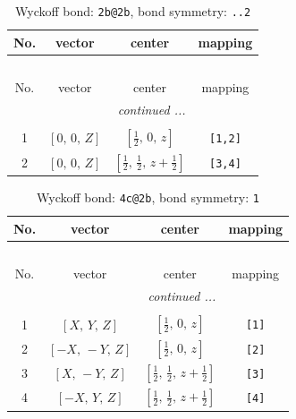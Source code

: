 \documentclass[fleqn,8pt]{jsarticle}
\begin{document}
\renewcommand{\arraystretch}{1.2}
\begin{longtable}{cccc}
\caption{Wyckoff bond: {\tt 2b@2b}, bond symmetry: {\tt ..2}}
 \\
 \hline \hline
No. & vector & center & mapping \\ \hline \endfirsthead

\multicolumn{3}{l}{\tablename\ \thetable{}} \\
 \hline \hline
No. & vector & center & mapping \\ \hline \endhead

 \hline \hline
\multicolumn{3}{r}{\footnotesize\it continued ...} \\ \endfoot

 \hline \hline
\multicolumn{3}{r}{} \\ \endlastfoot

1 & $\left[ 0,\, 0,\, Z \right]$ & $\left[ \frac{1}{2},\, 0,\, z \right]$ & {\tt [1,2]} \\ \hline
2 & $\left[ 0,\, 0,\, Z \right]$ & $\left[ \frac{1}{2},\, \frac{1}{2},\, z + \frac{1}{2} \right]$ & {\tt [3,4]} \\
\end{longtable}
\renewcommand{\arraystretch}{1.2}
\begin{longtable}{cccc}
\caption{Wyckoff bond: {\tt 4c@2b}, bond symmetry: {\tt 1}}
 \\
 \hline \hline
No. & vector & center & mapping \\ \hline \endfirsthead

\multicolumn{3}{l}{\tablename\ \thetable{}} \\
 \hline \hline
No. & vector & center & mapping \\ \hline \endhead

 \hline \hline
\multicolumn{3}{r}{\footnotesize\it continued ...} \\ \endfoot

 \hline \hline
\multicolumn{3}{r}{} \\ \endlastfoot

1 & $\left[ X,\, Y,\, Z \right]$ & $\left[ \frac{1}{2},\, 0,\, z \right]$ & {\tt [1]} \\ \hline
2 & $\left[ - X,\, - Y,\, Z \right]$ & $\left[ \frac{1}{2},\, 0,\, z \right]$ & {\tt [2]} \\ \hline
3 & $\left[ X,\, - Y,\, Z \right]$ & $\left[ \frac{1}{2},\, \frac{1}{2},\, z + \frac{1}{2} \right]$ & {\tt [3]} \\ \hline
4 & $\left[ - X,\, Y,\, Z \right]$ & $\left[ \frac{1}{2},\, \frac{1}{2},\, z + \frac{1}{2} \right]$ & {\tt [4]} \\
\end{longtable}
\end{document}
